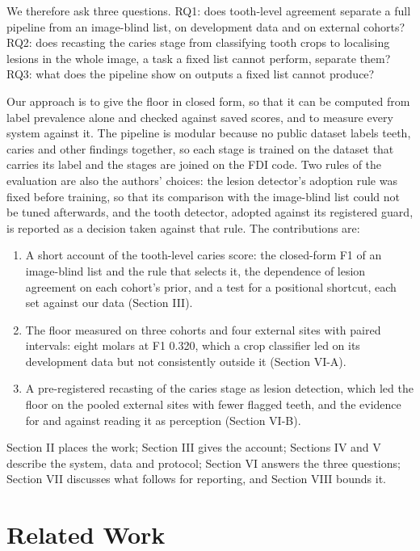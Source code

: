 \documentclass[conference]{IEEEtran}
\begin{document}
We therefore ask three questions. RQ1: does tooth-level agreement separate a full pipeline from an image-blind list, on development data and on external cohorts? RQ2: does recasting the caries stage from classifying tooth crops to localising lesions in the whole image, a task a fixed list cannot perform, separate them? RQ3: what does the pipeline show on outputs a fixed list cannot produce?

Our approach is to give the floor in closed form, so that it can be computed from label prevalence alone and checked against saved scores, and to measure every system against it. The pipeline is modular because no public dataset labels teeth, caries and other findings together, so each stage is trained on the dataset that carries its label and the stages are joined on the FDI code. Two rules of the evaluation are also the authors' choices: the lesion detector's adoption rule was fixed before training, so that its comparison with the image-blind list could not be tuned afterwards, and the tooth detector, adopted against its registered guard, is reported as a decision taken against that rule. The contributions are:

\begin{enumerate}
\item A short account of the tooth-level caries score: the closed-form F1 of an image-blind list and the rule that selects it, the dependence of lesion agreement on each cohort's prior, and a test for a positional shortcut, each set against our data (Section III).
\item The floor measured on three cohorts and four external sites with paired intervals: eight molars at F1 0.320, which a crop classifier led on its development data but not consistently outside it (Section VI-A).
\item A pre-registered recasting of the caries stage as lesion detection, which led the floor on the pooled external sites with fewer flagged teeth, and the evidence for and against reading it as perception (Section VI-B).
\end{enumerate}

Section II places the work; Section III gives the account; Sections IV and V describe the system, data and protocol; Section VI answers the three questions; Section VII discusses what follows for reporting, and Section VIII bounds it.

\section{Related Work}
\end{document}

